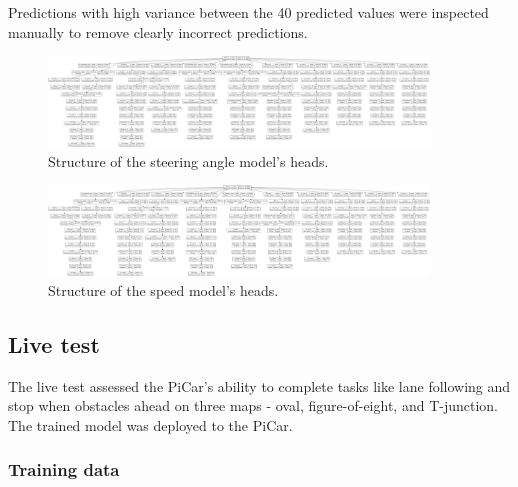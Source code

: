 \documentclass{article}
\begin{document}
Predictions with high variance between the 40 predicted values were inspected manually to remove clearly incorrect predictions.



\begin{figure}[h]
  \centering
  \includegraphics[width=0.9\textwidth]{figures/angle_heads.png}
  \caption{Structure of the steering angle model's heads.}
  \label{fig:angle_heads}
\end{figure}

\begin{figure}[h]
  \centering
  \includegraphics[width=0.9\textwidth]{figures/speed_heads.png}
  \caption{Structure of the speed model's heads.}
  \label{fig:speed_heads}
\end{figure}


\subsection{Live test}

The live test assessed the PiCar’s ability to complete tasks like lane following and stop when obstacles ahead on three maps - oval, figure-of-eight, and T-junction. The trained model was deployed to the PiCar.

\subsubsection{Training data}
\end{document}
